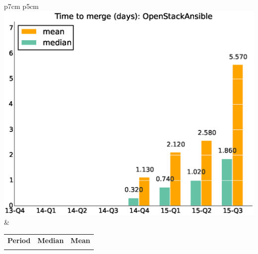 \documentclass[a4wide,11pt]{article}
\begin{document}
\begin{tabular}{p{7cm} p{5cm}}
    \vspace{0pt} 
    \includegraphics[scale=.35]{figs/timetoreview_medianOpenStackAnsible.eps}
    & 
    \vspace{0pt}
    \begin{tabular}{l|r|r|}%
    \bfseries Period & \bfseries Median & \bfseries Mean %
    \csvreader[head to column names]{data/timetoreview_medianOpenStackAnsible.csv}{}%
    {\\ & \mediantime & \meantime}
    \end{tabular}
\end{tabular}
\end{document}
